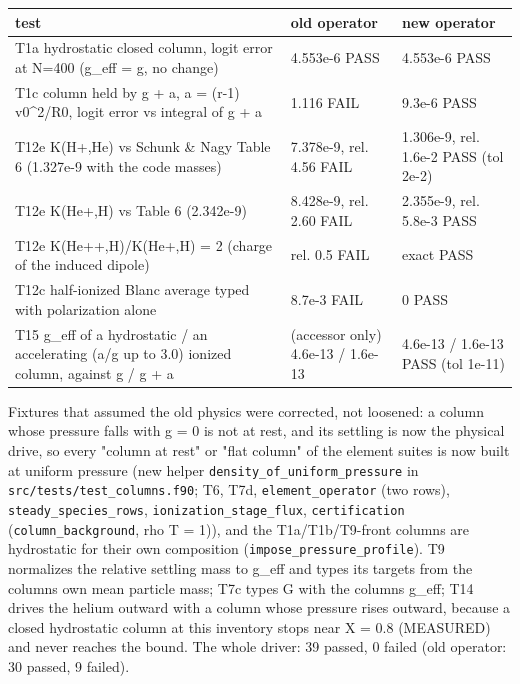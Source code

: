 \documentclass[english,a4paper]{my_memo}
\begin{document}
{\def\LTcaptype{none} %
{\small
\begin{longtable}[]{@{}lll@{}}
\toprule\noalign{}
test & old operator & new operator \\
\midrule\noalign{}
\endhead
\bottomrule\noalign{}
\endlastfoot
T1a hydrostatic closed column, logit error at N=400 (g\_eff = g, no change) & 4.553e-6 PASS & 4.553e-6 PASS \\
T1c column held by g + a, a = (r-1) v0\^{}2/R0, logit error vs integral of g + a & 1.116 FAIL & 9.3e-6 PASS \\
T12e K(H+,He) vs Schunk \& Nagy Table 6 (1.327e-9 with the code masses) & 7.378e-9, rel. 4.56 FAIL & 1.306e-9, rel. 1.6e-2 PASS (tol 2e-2) \\
T12e K(He+,H) vs Table 6 (2.342e-9) & 8.428e-9, rel. 2.60 FAIL & 2.355e-9, rel. 5.8e-3 PASS \\
T12e K(He++,H)/K(He+,H) = 2 (charge of the induced dipole) & rel. 0.5 FAIL & exact PASS \\
T12c half-ionized Blanc average typed with polarization alone & 8.7e-3 FAIL & 0 PASS \\
T15 g\_eff of a hydrostatic / an accelerating (a/g up to 3.0) ionized column, against g / g + a & (accessor only) 4.6e-13 / 1.6e-13 & 4.6e-13 / 1.6e-13 PASS (tol 1e-11) \\
\end{longtable}
}
}

Fixtures that assumed the old physics were corrected, not loosened: a
column whose pressure falls with g = 0 is not at rest, and its settling is
now the physical drive, so every "column at rest" or "flat column" of the
element suites is now built at uniform pressure (new helper
\texttt{density\_of\_uniform\_pressure} in \texttt{src/tests/test\_columns.f90}; T6, T7d,
\texttt{element\_operator} (two rows), \texttt{steady\_species\_rows}, \texttt{ionization\_stage\_flux},
\texttt{certification} (\texttt{column\_background}, rho T = 1)), and the T1a/T1b/T9-front
columns are hydrostatic for their own composition
(\texttt{impose\_pressure\_profile}). T9 normalizes the relative settling mass to
g\_eff and types its targets from the column\textquotesingle s own mean particle mass; T7c
types G with the column\textquotesingle s g\_eff; T14 drives the helium outward with a column
whose pressure rises outward, because a closed hydrostatic column at this
inventory stops near X = 0.8 (MEASURED) and never reaches the bound. The
whole driver: 39 passed, 0 failed (old operator: 30 passed, 9 failed).
\end{document}
